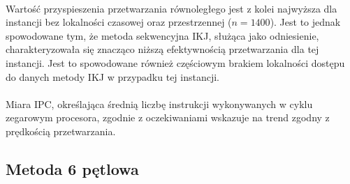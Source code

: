 \documentclass[12pt,a4paper]{article}
\begin{document}
\\
Wartość przyspieszenia przetwarzania równoległego jest z kolei najwyższa dla instancji bez lokalności czasowej oraz przestrzennej ($n=1400$). Jest to jednak spowodowane tym, że metoda sekwencyjna IKJ, służąca jako odniesienie, charakteryzowała się znacząco niższą efektywnością przetwarzania dla tej instancji. Jest to spowodowane również częściowym brakiem lokalności dostępu do danych metody IKJ w przypadku tej instancji.\\
\\
Miara IPC, określająca średnią liczbę instrukcji wykonywanych w cyklu zegarowym procesora, zgodnie z oczekiwaniami wskazuje na trend zgodny z prędkością przetwarzania.


\subsection{Metoda 6 pętlowa}
\end{document}

